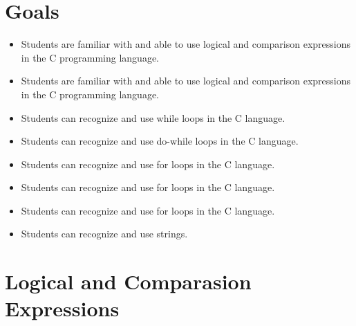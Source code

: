 \section{Goals}
\begin{itemize}[label=$\bullet$, itemsep=-1pt, leftmargin=*]
    \item Students are familiar with and able to use logical and comparison expressions in the C programming language.
    \item Students are familiar with and able to use logical and comparison expressions in the C programming language.
    \item Students can recognize and use while loops in the C language.
    \item Students can recognize and use do-while loops in the C language.
    \item Students can recognize and use for loops in the C language.
    \item Students can recognize and use for loops in the C language.
    \item Students can recognize and use for loops in the C language.
	\item Students can recognize and use strings.
\end{itemize}
\section{Logical and Comparasion Expressions}
